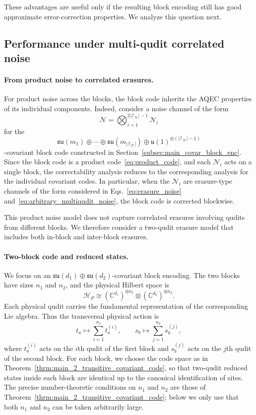 \documentclass[10pt,twocolumn,superscriptaddress,aps,amsmath,amssymb,citeautoscript,floatfix,prx]{revtex4-2}
\newcounter{alg}
\theoremstyle{plain}
\theoremstyle{plain}
\theoremstyle{plain}
\theoremstyle{plain}
\theoremstyle{plain}
\theoremstyle{plain}
\begin{document}
These advantages are useful only if the resulting block encoding still has good approximate error-correction properties. We analyze this question next.

\subsection{Performance under multi-qudit correlated noise}\label{subsec:main_covar_analog_noise}

\paragraph{From product noise to correlated erasures.}

For product noise across the blocks, the block code inherits the AQEC properties of its individual components. Indeed, consider a noise channel of the form
$$
\mathcal N
=
\bigotimes_{i=1}^{2|\mathcal I_{\mathcal H}|-1}
\mathcal N_i
$$
for the
$$
\mathfrak{su}(m_1)
\oplus
\cdots
\oplus
\mathfrak{su}(m_{|\mathcal I_{\mathcal H}|})
\oplus
\mathfrak{u}(1)^{\oplus(|\mathcal I_{\mathcal H}|-1)}
$$
-covariant block code constructed in Section~\ref{subsec:main_covar_block_enc}. Since the block code is a product code~\eqref{eq:product_code}, and each $\mathcal N_i$ acts on a single block, the correctability analysis reduces to the corresponding analysis for the individual covariant codes. In particular, when the $\mathcal N_i$ are erasure-type channels of the form considered in Eqs.~\eqref{eq:erasure_noise} and~\eqref{eq:arbitrary_multiqudit_noise}, the block code is corrected blockwise.

This product noise model does not capture correlated erasures involving qudits from different blocks. We therefore consider a two-qudit erasure model that includes both in-block and inter-block erasures.

\paragraph{Two-block code and reduced states.}

We focus on an
$\mathfrak{su}(d_1)\oplus\mathfrak{su}(d_2)$-covariant block encoding. The two blocks have sizes $n_1$ and $n_2$, and the physical Hilbert space is
$$
\mathcal H_P
\cong
(\mathbb C^{d_1})^{\otimes n_1}
\otimes
(\mathbb C^{d_2})^{\otimes n_2}.
$$
Each physical qudit carries the fundamental representation of the corresponding Lie algebra. Thus the transversal physical action is
$$
t_a
\longmapsto
\sum_{i=1}^{n_1} t_a^{(i)},
\qquad
s_b
\longmapsto
\sum_{j=1}^{n_2} s_b^{(j)},
$$
where $t_a^{(i)}$ acts on the $i$th qudit of the first block and $s_b^{(j)}$ acts on the $j$th qudit of the second block. For each block, we choose the code space as in Theorem~\ref{thrm:main_2_transitive_covariant_code}, so that two-qudit reduced states inside each block are identical up to the canonical identification of sites. The precise number-theoretic conditions on $n_1$ and $n_2$ are those of Theorem~\ref{thrm:main_2_transitive_covariant_code}; below we only use that both $n_1$ and $n_2$ can be taken arbitrarily large.
\end{document}
